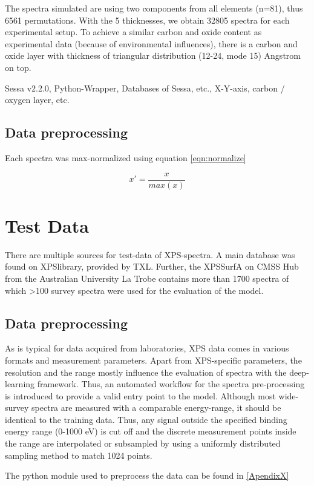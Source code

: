 The spectra simulated are using two components from all elements (n=81), thus 6561 permutations. With the 5 thicknesses, we obtain 32805 spectra for each experimental setup. To achieve a similar carbon and oxide content as experimental data (because of environmental influences), there is a carbon and oxide layer with thickness of triangular distribution (12-24, mode 15) Angstrom on top. 


Sessa v2.2.0, Python-Wrapper, Databases of Sessa, etc., X-Y-axis, carbon / oxygen layer, etc.


\subsection{Data preprocessing}

Each spectra was max-normalized using equation \ref{eqn:normalize} 

\begin{equation}
    x' = \frac{x}{max(x)}
\label{eqn:normalize}
\end{equation}


\section{Test Data}

There are multiple sources for test-data of XPS-spectra. A main database was found on XPSlibrary, provided by TXL. Further, the XPSSurfA on CMSS Hub from the Australian University La Trobe contains more than 1700 spectra of which >100 survey spectra were used for the evaluation of the model.


\subsection{Data preprocessing}

As is typical for data acquired from laboratories, XPS data comes in various formats and measurement parameters. Apart from XPS-specific parameters, the resolution and the range mostly influence the evaluation of spectra with the deep-learning framework. Thus, an automated workflow for the spectra pre-processing is introduced to provide a valid entry point to the model.
Although most wide-survey spectra are measured with a comparable energy-range, it should be identical to the training data. Thus, any signal outside the specified binding energy range (0-1000 eV) is cut off and the discrete measurement points inside the range are interpolated or subsampled by using a uniformly distributed sampling method to match 1024 points.

The python module used to preprocess the data can be found in \ref{ApendixX}